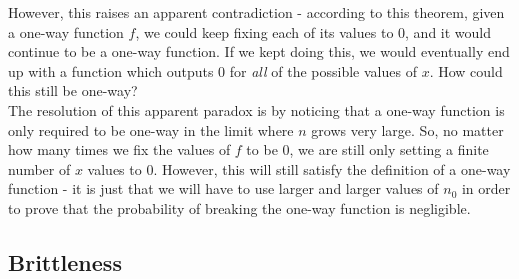 \documentclass[12pt]{tufte-book}
\begin{document}
However, this raises an apparent contradiction - according to this theorem, given a one-way function $f$, we could keep fixing each of its values to $0$, and it would continue to be a one-way function.  If we kept doing this, we would eventually end up with a function which outputs 0 for {\em all} of the possible values of $x$.  How could this still be one-way?\\

The resolution of this apparent paradox is by noticing that a one-way function is only required to be one-way in the limit where $n$ grows very large.  So, no matter how many times we fix the values of $f$ to be 0, we are still only setting a finite number of $x$ values to 0.  However, this will still satisfy the definition of a one-way function - it is just that we will have to use larger and larger values of $n_0$ in order to prove that the probability of breaking the one-way function is negligible.

\subsection{Brittleness}
\end{document}
